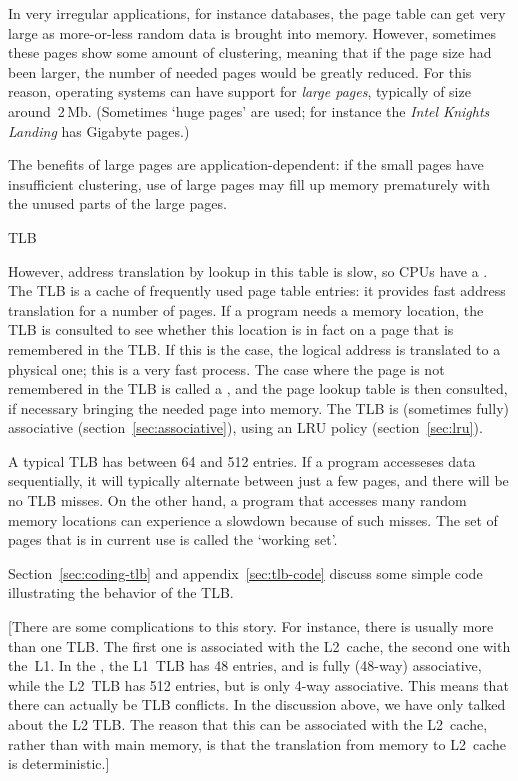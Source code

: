 In very irregular applications, for instance databases, the page table
can get very large as more-or-less random data is brought into
memory. However, sometimes these pages show some amount of clustering,
meaning that if the page size had been larger, the number of needed
pages would be greatly reduced. For this reason, operating systems can
have support for \emph{large pages},
typically of size around~2$\,$Mb. (Sometimes `huge pages' are used; for
instance the
\emph{Intel Knights Landing}
has Gigabyte pages.)

The benefits of large pages are application-dependent: if the small
pages have insufficient clustering, use of large pages may fill up
memory prematurely with the unused parts of the large pages.

 {TLB}
\label{sec:tlb}

However, address translation by lookup in this table is slow, so \acp{CPU}
have a .
The \ac{TLB} is a cache of frequently used 
page table entries: it provides fast address translation for a number
of pages. If a program needs a memory
location, the \ac{TLB} is consulted to see whether this location is in fact
on a page that is remembered in the \ac{TLB}. 
If this is the case, the logical address is
translated to a physical one; this is a very fast process.
The case
where the page is not remembered in the \ac{TLB} is called a
, and the page lookup table is then consulted,
if necessary bringing the needed page into memory.
The \ac{TLB} is (sometimes fully) associative
(section~\ref{sec:associative}), using an LRU policy
(section~\ref{sec:lru}).

A typical \ac{TLB} has between 64 and 512 entries.
If a program accesseses
data sequentially, it will typically alternate between just a few
pages, and there will be no \ac{TLB} misses.
On the other hand, a program
that accesses many random memory locations can experience a slowdown
because of such misses. The set of pages that is in current use is
called the `working set'.

Section~\ref{sec:coding-tlb} and appendix~\ref{sec:tlb-code} discuss
some simple code illustrating the
behavior of the \ac{TLB}.

[There are some complications to this story. For instance, there is
  usually more than one \ac{TLB}. The first one is associated with the
  L2~cache, the second one with the~L1. In the
  , the L1~\ac{TLB} has 48 entries, and
  is fully (48-way) associative, while the L2~\ac{TLB} has 512
  entries, but is only 4-way associative. This means that there can
  actually be \ac{TLB} conflicts. In the discussion above, we have
  only talked about the L2 \ac{TLB}. The reason that this can be
  associated with the L2~cache, rather than with main memory, is that
  the translation from memory to L2~cache is deterministic.]

